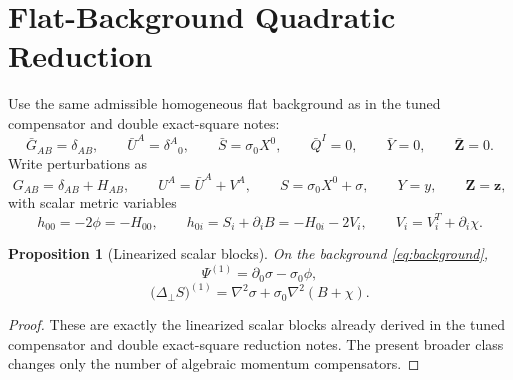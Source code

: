 \documentclass[11pt]{article}
\newtheorem{proposition}{Proposition}
\begin{document}
\section{Flat-Background Quadratic Reduction}

Use the same admissible homogeneous flat background as in the tuned compensator and double exact-square notes:
\begin{equation}
\bar G_{AB}=\delta_{AB},
\qquad
\bar U^A=\delta^A{}_0,
\qquad
\bar S=\sigma_0X^0,
\qquad
\bar Q^I=0,
\qquad
\bar Y=0,
\qquad
\bar{\bm Z}=0.
\label{eq:background}
\end{equation}
Write perturbations as
\begin{equation}
G_{AB}=\delta_{AB}+H_{AB},
\qquad
U^A=\bar U^A+V^A,
\qquad
S=\sigma_0X^0+\sigma,
\qquad
Y=y,
\qquad
\bm Z=\bm z,
\label{eq:perturb}
\end{equation}
with scalar metric variables
\begin{equation}
h_{00}=-2\phi=-H_{00},
\qquad
h_{0i}=S_i+\partial_iB=-H_{0i}-2V_i,
\qquad
V_i=V_i^T+\partial_i\chi.
\label{eq:metricpert}
\end{equation}

\begin{proposition}[Linearized scalar blocks]
\label{prop:lin}
On the background \eqref{eq:background},
\begin{equation}
\Psi^{(1)}
=
\partial_0\sigma-\sigma_0\phi,
\label{eq:linPsi}
\end{equation}
\begin{equation}
\bigl(\Delta_\perp S\bigr)^{(1)}
=
\nabla^2\sigma+\sigma_0\nabla^2(B+\chi).
\label{eq:linXi}
\end{equation}
\end{proposition}

\begin{proof}
These are exactly the linearized scalar blocks already derived in the tuned compensator and double exact-square reduction notes. The present broader class changes only the number of algebraic momentum compensators.
\end{proof}
\end{document}
